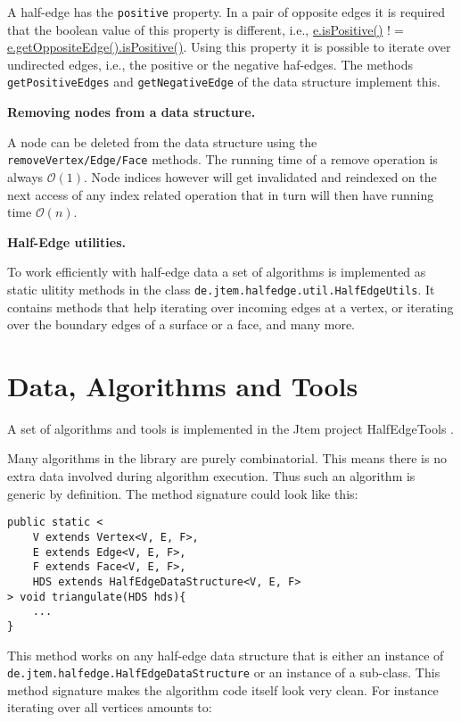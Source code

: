 \documentclass[Thesis.tex]{subfiles}
\begin{document}
A half-edge has the {\tt positive} property. In a pair of opposite edges it is required that the boolean
value of this property is different, i.e., \url{e.isPositive()} $!=$ \url{e.getOppositeEdge().isPositive()}.
Using this property it is possible to iterate over undirected edges, i.e., the positive or the negative
haf-edges. The methods {\tt getPositiveEdges} and {\tt getNegativeEdge} of the data structure 
implement this.

{\bf Removing nodes from a data structure.}

A node can be deleted from the data structure using the {\tt removeVertex/Edge/Face} methods.
The running time of a remove operation is always $\mathcal{O}(1)$. Node indices however will
get invalidated and reindexed on the next access of any index related operation that in turn will
then have running time $\mathcal{O}(n)$.

{\bf Half-Edge utilities.}

To work efficiently with half-edge data a set of algorithms is implemented as static ulitity methods
in the class {\tt de.jtem.half\-edge.util.Half\-Edge\-Utils}. It contains methods that help iterating 
over incoming edges at a vertex, or iterating over the boundary edges of a surface or a face, and many more.


\section{Data, Algorithms and Tools}

A set of algorithms and tools is implemented in the {\sc Jtem} project {\sc HalfEdgeTools}
\cite{JtemWebsite}. 

Many algorithms in the library are purely combinatorial. This means there is no extra data 
involved during algorithm execution. Thus such an algorithm is generic by definition. The
method signature could look like this:

\begin{lstlisting}
public static <
	V extends Vertex<V, E, F>,
	E extends Edge<V, E, F>,
	F extends Face<V, E, F>,
	HDS extends HalfEdgeDataStructure<V, E, F>
> void triangulate(HDS hds){
	...
}
\end{lstlisting}

This method works on any half-edge data structure that is either an instance of {\tt
de.jtem.half\-edge.HalfEdgeDataStructure} or an instance of a sub-class. This method
signature makes the algorithm code itself look very clean. For instance iterating over
all vertices amounts to:
\end{document}
